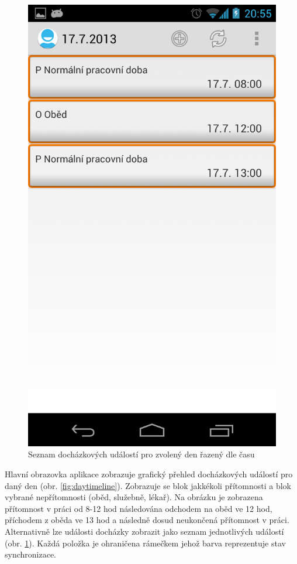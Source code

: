 \documentclass{diplomka}
\begin{document}
\begin{figure}[H]
\begin{minipage}{.45\textwidth}
  \includegraphics[width=.9\linewidth]{scr/daytimelinealt.png}
  \caption{Seznam docházkových událostí pro zvolený den řazený dle času}
  \label{fig:daytimelinealt}
\end{minipage}
\end{figure}
Hlavní obrazovka aplikace zobrazuje grafický přehled docházkových událostí pro daný den (obr. \ref{fig:daytimeline}). Zobrazuje se blok jakkékoli přítomnosti a blok vybrané nepřítomnosti (oběd, služebně, lékař). Na obrázku je zobrazena přítomnost v práci od 8-12 hod následována odchodem na oběd ve 12 hod, příchodem z oběda ve 13 hod a následně dosud neukončená přítomnost v práci. Alternativně lze události docházky zobrazit jako seznam jednotlivých událostí (obr. \ref{fig:daytimelinealt}). Každá položka je ohraničena rámečkem jehož barva reprezentuje stav synchronizace.\newpage
\end{document}
